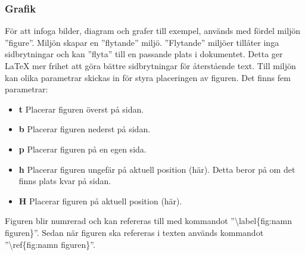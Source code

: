 \subsubsection{Grafik}
För att infoga bilder, diagram och grafer till exempel, används med fördel miljön ''figure''. Miljön skapar en ''flytande'' miljö. ''Flytande'' miljöer tillåter inga sidbrytningar och kan ''flyta'' till en passande plats i dokumentet. Detta ger {\LaTeX} mer frihet att göra bättre sidbrytningar för återstående text. Till miljön kan olika parametrar skickas in för styra placeringen av figuren. Det finns fem parametrar: 
\begin{itemize}
	\item \textbf{t} Placerar figuren överst på sidan.
	\item \textbf{b} Placerar figuren nederst på sidan.
	\item \textbf{p} Placerar figuren på en egen sida. 
	\item \textbf{h} Placerar figuren ungefär på aktuell position (här). Detta beror på om det finns plats kvar på sidan. 
	\item \textbf{H} Placerar figuren på aktuell position (här). 
\end{itemize}
Figuren blir numrerad och kan refereras till med kommandot ''\textbackslash label\{fig:namn figuren\}''. Sedan när figuren ska refereras i texten används kommandot ''\textbackslash ref\{fig:namn figuren\}''. \citep{latexandfriends} 

